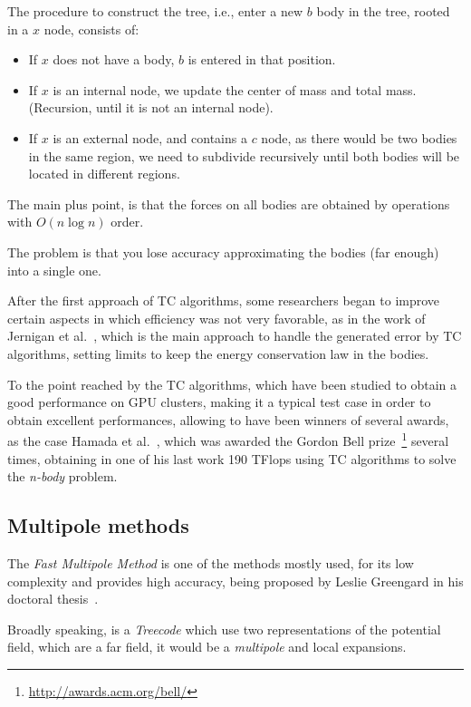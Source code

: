 The procedure to construct the tree, i.e., enter a new $b$ body in the tree,
rooted in a $x$ node, consists of:
\begin{itemize}
    \item If $x$ does not have a body, $b$ is entered in that position.
    \item If $x$ is an internal node, we update the center of mass and total mass.
          (Recursion, until it is not an internal node).
    \item If $x$ is an external node, and contains a $c$ node,
          as there would be two bodies in the same region,
          we need to subdivide recursively until both bodies
          will be located in different regions.
\end{itemize}

The main plus point,
is that the forces on all bodies are obtained by operations
with $O(n\log n)$ order.

The problem is that you lose accuracy approximating the bodies (far enough)
into a single one.

After the first approach of TC algorithms,
some researchers began to improve certain aspects
in which efficiency was not very favorable,
as in the work of Jernigan et al.~\cite{jernigan},
which is the main approach to handle the
generated error by TC algorithms,
setting limits to keep the energy conservation law
in the bodies.

To the point reached by the TC algorithms,
which have been studied to obtain a good performance
on GPU clusters, making it a typical test case
in order to obtain excellent performances,
allowing to have been winners of several awards,
as the case Hamada et al.~\cite{hamada},
which was awarded the Gordon Bell prize~\footnote{\url{http://awards.acm.org/bell/}}
several times, obtaining in one of his last work
190 TFlops using TC algorithms to solve the \emph{n-body} problem.

\subsection{Multipole methods}

The \emph{Fast Multipole Method} is one of the methods
mostly used, for its low complexity and provides high accuracy,
being proposed by Leslie Greengard in his doctoral thesis~\cite{leslie}.

Broadly speaking, is a \emph{Treecode} which use
two representations of the potential field,
which are a far field, it would be a \emph{multipole}
and local expansions.

